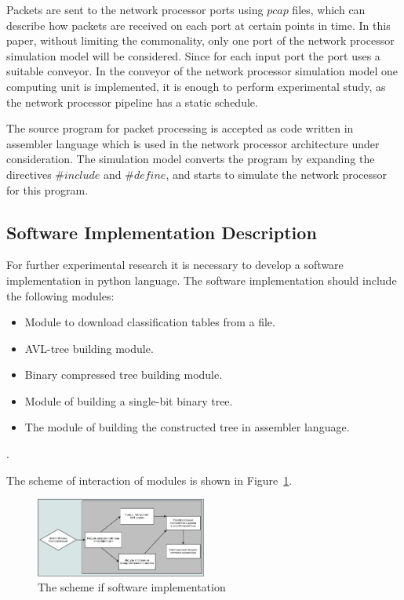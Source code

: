 \documentclass[conference]{IEEEtran}
\begin{document}
            Packets are sent to the network processor ports using $pcap$ files, 
            which can describe how packets are received on each port at certain points in time.
            In this paper, without limiting the commonality, only one port of the 
            network processor simulation model will be considered. Since for each input port
            the port uses a suitable conveyor. In the conveyor of the network processor 
            simulation model one computing unit is implemented, it is enough to perform 
            experimental study, as the network processor pipeline has a static schedule.

            The source program for packet processing is accepted as code 
            written in assembler language which is used in the network processor architecture under consideration.
            The simulation model converts the program by expanding 
            the directives $\#include$ and $\#define$, and starts to simulate the network processor for this program.
 
        \subsection{Software Implementation Description}
            For further experimental research it is necessary 
            to develop a software implementation in python language. 
            The software implementation should include the following modules:
        
            \begin{itemize}
                \item Module to download classification tables from a file.
                \item AVL-tree building module.
                \item Binary compressed tree building module.
                \item Module of building a single-bit binary tree.
                \item The module of building the constructed tree in assembler language.
            \end{itemize}.
            
            The scheme of interaction of modules is shown in Figure~\ref{fig:mesh5}.

        \begin{figure}[ht]
            \centering
            \includegraphics[width=0.5\textwidth]{program_scheme.jpg}
            \caption{The scheme if software implementation}\label{fig:mesh5}
        \end{figure}
\end{document}
